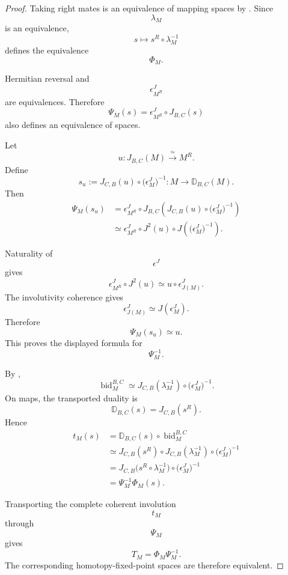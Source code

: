\begin{proof}
Taking right mates is an equivalence of mapping spaces by
. Since
\[
    \lambda_M
\]
is an equivalence,
\[
    s
    \longmapsto
    s^R\circ\lambda_M^{-1}
\]
defines the equivalence
\[
    \Phi_M.
\]

Hermitian reversal and
\[
    \epsilon^J_{M^R}
\]
are equivalences. Therefore
\[
    \Psi_M(s)
    =
    \epsilon^J_{M^R}
    \circ
    J_{B,C}(s)
\]
also defines an equivalence of spaces.

Let
\[
    u
    \colon
    J_{B,C}(M)
    \xrightarrow{\;\simeq\;}
    M^R.
\]
Define
\[
    s_u
    :=
    J_{C,B}(u)
    \circ
    \bigl(
        \epsilon^J_M
    \bigr)^{-1}
    \colon
    M
    \longrightarrow
    \mathbb D_{B,C}(M).
\]
Then
\[
\begin{aligned}
    \Psi_M(s_u)
    &=
    \epsilon^J_{M^R}
    \circ
    J_{B,C}
    \left(
        J_{C,B}(u)
        \circ
        \bigl(
            \epsilon^J_M
        \bigr)^{-1}
    \right)
    \\
    &\simeq
    \epsilon^J_{M^R}
    \circ
    J^2(u)
    \circ
    J
    \left(
        \bigl(
            \epsilon^J_M
        \bigr)^{-1}
    \right).
\end{aligned}
\]

Naturality of
\[
    \epsilon^J
\]
gives
\[
    \epsilon^J_{M^R}
    \circ
    J^2(u)
    \simeq
    u\circ\epsilon^J_{J(M)}.
\]
The involutivity coherence gives
\[
    \epsilon^J_{J(M)}
    \simeq
    J(\epsilon^J_M).
\]
Therefore
\[
    \Psi_M(s_u)
    \simeq
    u.
\]
This proves the displayed formula for
\[
    \Psi_M^{-1}.
\]

By
,
\[
    \operatorname{bid}^{B,C}_M
    \simeq
    J_{C,B}(\lambda_M^{-1})
    \circ
    \bigl(
        \epsilon^J_M
    \bigr)^{-1}.
\]
On maps, the transported duality is
\[
    \mathbb D_{B,C}(s)
    =
    J_{C,B}(s^R).
\]
Hence
\[
\begin{aligned}
    t_M(s)
    &=
    \mathbb D_{B,C}(s)
    \circ
    \operatorname{bid}^{B,C}_M
    \\
    &\simeq
    J_{C,B}(s^R)
    \circ
    J_{C,B}(\lambda_M^{-1})
    \circ
    \bigl(
        \epsilon^J_M
    \bigr)^{-1}
    \\
    &=
    J_{C,B}
    \bigl(
        s^R\circ\lambda_M^{-1}
    \bigr)
    \circ
    \bigl(
        \epsilon^J_M
    \bigr)^{-1}
    \\
    &=
    \Psi_M^{-1}\Phi_M(s).
\end{aligned}
\]

Transporting the complete coherent involution
\[
    t_M
\]
through
\[
    \Psi_M
\]
gives
\[
    T_M
    =
    \Phi_M\Psi_M^{-1}.
\]
The corresponding homotopy-fixed-point spaces are therefore equivalent.
\end{proof}


